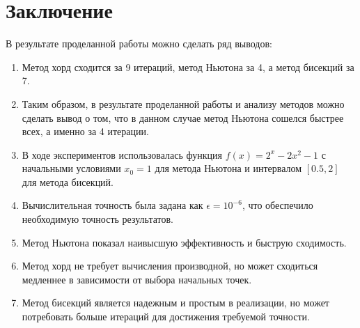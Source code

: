 \documentclass{article}
\begin{document}
\section*{Заключение}
В результате проделанной работы можно сделать ряд выводов:
\begin{enumerate}
    \item Метод хорд сходится за 9 итераций, метод Ньютона за 4, а метод бисекций за 7.
    \item Таким образом, в результате проделанной работы и анализу методов можно сделать вывод о том, что в данном случае метод Ньютона сошелся быстрее всех, а именно за 4 итерации.
    \item В ходе экспериментов использовалась функция \( f(x) = 2^x - 2x^2 - 1 \) с начальными условиями \( x_0 = 1 \) для метода Ньютона и интервалом \([0.5, 2]\) для метода бисекций.
    \item Вычислительная точность была задана как \( \epsilon = 10^{-6} \), что обеспечило необходимую точность результатов.
    \item Метод Ньютона показал наивысшую эффективность и быструю сходимость.
    \item Метод хорд не требует вычисления производной, но может сходиться медленнее в зависимости от выбора начальных точек.
    \item Метод бисекций является надежным и простым в реализации, но может потребовать больше итераций для достижения требуемой точности.
   
\end{enumerate}
\end{document}
